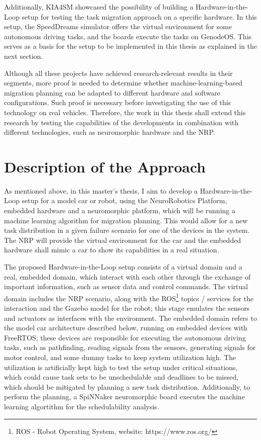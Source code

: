 Additionally, KIA4SM showcased the possibility of building a Hardware-in-the-Loop setup for testing the task migration approach on a specific hardware. In this setup, the SpeedDreams simulator offers the virtual environment for some autonomous driving tasks, and the boards execute the tasks on GenodeOS. This serves as a basis for the setup to be implemented in this thesis as explained in the next section.

Although all these projects have achieved research-relevant results in their segments, more proof is needed to determine whether machine-learning-based migration planning can be adapted to different hardware and software configurations. Such proof is necessary before investigating the use of this technology on real vehicles. Therefore, the work in this thesis shall extend this research by testing the capabilities of the developments in combination with different technologies, such as neuromorphic hardware and the NRP.

\section*{Description of the Approach}\label{section:descriptionapproach}
As mentioned above, in this master’s thesis, I aim to develop a Hardware-in-the-Loop setup for a model car or robot, using the NeuroRobotics Platform, embedded hardware and a neuromorphic platform, which will be running a machine learning algorithm for migration planning. This would allow for a new task distribution in a given failure scenario for one of the devices in the system. The NRP will provide the virtual environment for the car and the embedded hardware shall mimic a car to show its capabilities in a real situation.

The proposed Hardware-in-the-Loop setup consists of a virtual domain and a real, embedded domain, which interact with each other through the exchange of important information, such as sensor data and control commands. The virtual domain includes the NRP scenario, along with the ROS\footnote{ROS - Robot Operating System, website: https://www.ros.org/} topics / services for the interaction and the Gazebo model for the robot; this stage emulates the sensors and actuators as interfaces with the environment. The embedded domain refers to the model car architecture described below, running on embedded devices with FreeRTOS; these devices are responsible for executing the autonomous driving tasks, such as pathfinding, reading signals from the sensors, generating signals for motor control, and some dummy tasks to keep system utilization high. The utilization is artificially kept high to test the setup under critical situations, which could cause task sets to be unschedulable and deadlines to be missed, which should be mitigated by planning a new task distribution. Additionally, to perform the planning, a SpiNNaker neuromorphic board executes the machine learning algortithm for the schedulability analysis.

